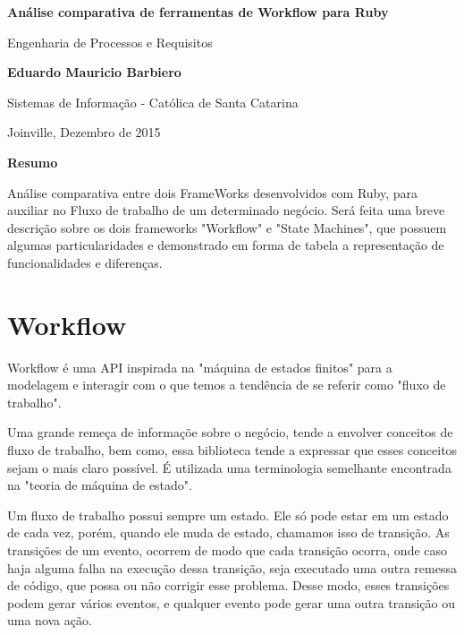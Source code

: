 \documentclass[12pt, letterpaper]{article}
\begin{document}
\begin{center}
    \Large
    \textbf{Análise comparativa de ferramentas de Workflow para Ruby}
    
    \vspace{0.4cm}
    \large
    Engenharia de Processos e Requisitos
    
    \vspace{0.4cm}
    \textbf{Eduardo Mauricio Barbiero}
    
    \vspace{0.4cm}
    \large
    Sistemas de Informação - Católica de Santa Catarina
    
    \vspace{0.4cm}
    {Joinville, Dezembro de 2015}
    
    \vspace{0.9cm}
    \textbf{Resumo}
\end{center}

\par
Análise comparativa entre dois FrameWorks desenvolvidos com Ruby, para auxiliar no Fluxo de trabalho de um determinado negócio. Será feita uma breve descrição sobre os dois frameworks "Workflow" e "State Machines", que possuem algumas particularidades e demonstrado em forma de tabela a representação de funcionalidades e diferenças. 

\section{Workflow}

Workflow é uma API inspirada na "máquina de estados finitos" para a modelagem e interagir com o que temos a tendência de se referir como "fluxo de trabalho".

Uma grande remeça de informaçõe sobre o negócio, tende a envolver conceitos de fluxo de trabalho, bem como, essa biblioteca tende a expressar que esses conceitos sejam o mais claro possível. É utilizada uma terminologia semelhante encontrada na "teoria de máquina de estado".

Um fluxo de trabalho possui sempre um estado. Ele só pode estar em um estado de cada vez, porém, quando ele muda de estado, chamamos isso de transição. As transições de um evento, ocorrem de modo que cada transição ocorra, onde caso haja alguma falha na execução dessa transição, seja executado uma outra remessa de código, que possa ou não corrigir esse problema. Desse modo, esses transições podem gerar vários eventos, e qualquer evento pode gerar uma outra transição ou uma nova ação.
\end{document}
